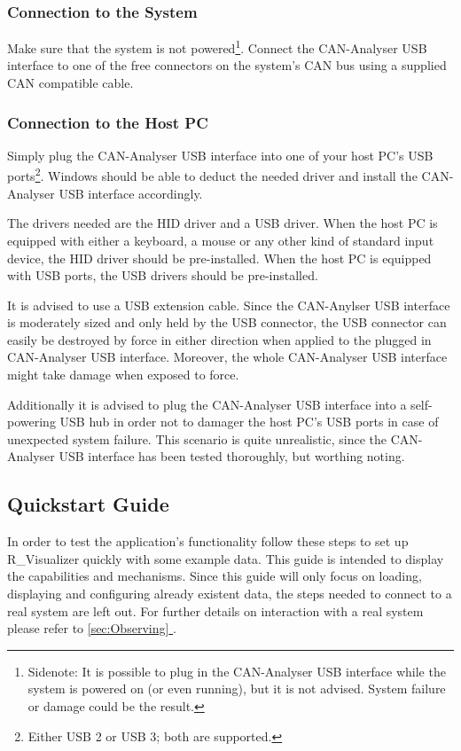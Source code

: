 \documentclass[12pt,a4paper]{scrartcl}
\newcommand*{\fullref}[1]{\hyperref[{#1}]{\autoref*{#1} \nameref*{#1}}} %
\begin{document}
\subsubsection{Connection to the System}
\label{subsubsec:GettingStartedEstablishConnectionConnectionToSystem}
Make sure that the system is not powered\footnote{Sidenote: It is possible to plug in the CAN-Analyser USB interface while the system is powered on (or even running), but it is not advised. System failure or damage could be the result.}. Connect the CAN-Analyser USB interface to one of the free connectors on the system's CAN bus using a supplied CAN compatible cable. 


\subsubsection{Connection to the Host PC}
\label{subsubsec:GettingStartedEstablishConnectionConnectionToHost}
Simply plug the CAN-Analyser USB interface into one of your host PC's USB ports\footnote{Either USB 2 or USB 3; both are supported.}. Windows should be able to deduct the needed driver and install the CAN-Analyser USB interface accordingly. 

The drivers needed are the HID driver and a USB driver. When the host PC is equipped with either a keyboard, a mouse or any other kind of standard input device, the HID driver should be pre-installed. When the host PC is equipped with USB ports, the USB drivers should be pre-installed. 

It is advised to use a USB extension cable. Since the CAN-Anylser USB interface is moderately sized and only held by the USB connector, the USB connector can easily be destroyed by force in either direction when applied to the plugged in CAN-Analyser USB interface. Moreover, the whole CAN-Analyser USB interface might take damage when exposed to force.

Additionally it is advised to plug the CAN-Analyser USB interface into a self-powering USB hub in order not to damager the host PC's USB ports in case of unexpected system failure. This scenario is quite unrealistic, since the CAN-Analyser USB interface has been tested thoroughly, but worthing noting.


\FloatBarrier
\subsection{Quickstart Guide}
\label{subsec:GettingStartedQuickStart}
In order to test the application's functionality follow these steps to set up R\_Visualizer quickly with some example data. This guide is intended to display the capabilities and mechanisms. Since this guide will only focus on loading, displaying and configuring already existent data, the steps needed to connect to a real system are left out. For further details on interaction with a real system please refer to  \fullref{sec:Observing}.\\
\end{document}
